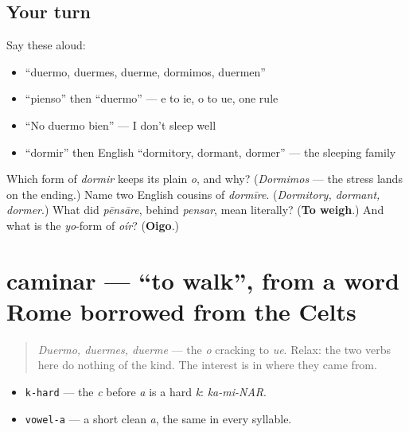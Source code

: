 \subsection*{Your turn}
Say these aloud:

\begin{itemize}
\raggedright
  \item \textquotedblleft{}duermo, duermes, duerme, dormimos, duermen\textquotedblright{}
  \item \textquotedblleft{}pienso\textquotedblright{} then \textquotedblleft{}duermo\textquotedblright{} — e to ie, o to ue, one rule
  \item \textquotedblleft{}No duermo bien\textquotedblright{} — I don't sleep well
  \item \textquotedblleft{}dormir\textquotedblright{} then English \textquotedblleft{}dormitory, dormant, dormer\textquotedblright{} — the sleeping family
\end{itemize}

\begin{tcolorbox}[breakable,colback=teal!4,colframe=teal!35!black,title={Before you move on}]
Which form of \emph{dormir} keeps its plain \emph{o}, and why? (\emph{Dormimos} — the stress lands on the ending.) Name two English cousins of \emph{dormīre}. (\emph{Dormitory, dormant, dormer}.) What did \emph{pēnsāre}, behind \emph{pensar}, mean literally? (\textbf{To weigh}.) And what is the \emph{yo}-form of \emph{oír}? (\textbf{Oigo}.)
\end{tcolorbox}
\section[caminar]{caminar — \textquotedblleft{}to walk\textquotedblright{}, from a word Rome borrowed from the Celts}

\label{lesson:ES-C36-caminar}



\begin{quote}
\emph{Duermo, duermes, duerme} — the \emph{o} cracking to \emph{ue}. Relax: the two verbs here do nothing of the kind. The interest is in where they came from.
\end{quote}

\begin{sounds}
\begin{itemize}
\raggedright
  \item \texttt{k-hard} — the \emph{c} before \emph{a} is a hard \emph{k}: \emph{ka-mi-NAR}.
  \item \texttt{vowel-a} — a short clean \emph{a}, the same in every syllable.
\end{itemize}
\end{sounds}

